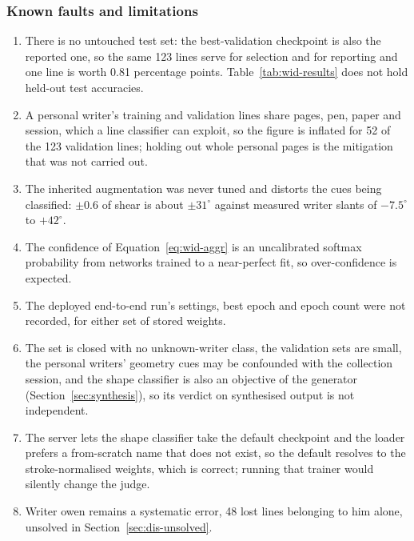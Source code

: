 \subsubsection{Known faults and limitations}
\label{sec:wid-faults}

\begin{enumerate}\setlength{\itemsep}{0pt}\setlength{\parskip}{0pt}
\item There is no untouched test set: the best-validation checkpoint is also the reported one, so the same 123 lines serve for selection and for reporting and one line is worth 0.81 percentage points. Table~\ref{tab:wid-results} does not hold held-out test accuracies.
\item A personal writer's training and validation lines share pages, pen, paper and session, which a line classifier can exploit, so the figure is inflated for 52 of the 123 validation lines; holding out whole personal pages is the mitigation that was not carried out.
\item The inherited augmentation was never tuned and distorts the cues being classified: $\pm0.6$ of shear is about $\pm31^\circ$ against measured writer slants of $-7.5^\circ$ to $+42^\circ$.
\item The confidence of Equation~\ref{eq:wid-aggr} is an uncalibrated softmax probability from networks trained to a near-perfect fit, so over-confidence is expected.
\item The deployed end-to-end run's settings, best epoch and epoch count were not recorded, for either set of stored weights.
\item The set is closed with no unknown-writer class, the validation sets are small, the personal writers' geometry cues may be confounded with the collection session, and the shape classifier is also an objective of the generator (Section~\ref{sec:synthesis}), so its verdict on synthesised output is not independent.
\item The server lets the shape classifier take the default checkpoint and the loader prefers a from-scratch name that does not exist, so the default resolves to the stroke-normalised weights, which is correct; running that trainer would silently change the judge.
\item Writer owen remains a systematic error, 48 lost lines belonging to him alone, unsolved in Section~\ref{sec:dis-unsolved}.
\end{enumerate}
